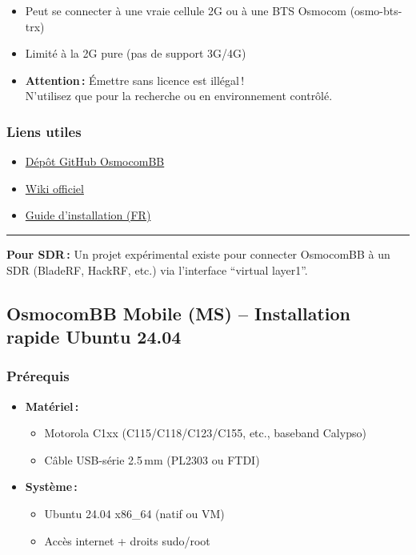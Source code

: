 \documentclass[
]{article}
\providecommand{\tightlist}{%
  \setlength{\itemsep}{0pt}\setlength{\parskip}{0pt}}
\begin{document}
\begin{itemize}
\tightlist
\item
  Peut se connecter à une vraie cellule 2G ou à une BTS Osmocom
  (osmo-bts-trx)
\item
  Limité à la 2G pure (pas de support 3G/4G)
\item
  \textbf{Attention\,:} Émettre sans licence est illégal\,!\\
  N'utilisez que pour la recherche ou en environnement contrôlé.
\end{itemize}

\subsubsection{Liens utiles}\label{liens-utiles}

\begin{itemize}
\tightlist
\item
  \href{https://github.com/osmocom/osmocom-bb}{Dépôt GitHub OsmocomBB}
\item
  \href{https://osmocom.org/projects/baseband/wiki/OsmocomBB}{Wiki
  officiel}
\item
  \href{https://www.lafabriquedunet.fr/blog/osmocombb-guide/}{Guide
  d'installation (FR)}
\end{itemize}

\begin{center}\rule{0.5\linewidth}{0.5pt}\end{center}

\textbf{Pour SDR\,:} Un projet expérimental existe pour connecter
OsmocomBB à un SDR (BladeRF, HackRF, etc.) via l'interface ``virtual
layer1''.

\subsection{OsmocomBB Mobile (MS) -- Installation rapide Ubuntu
24.04}\label{osmocombb-mobile-ms-installation-rapide-ubuntu-24.04}

\subsubsection{Prérequis}\label{pruxe9requis}

\begin{itemize}
\item
  \textbf{Matériel\,:}

  \begin{itemize}
  \tightlist
  \item
    Motorola C1xx (C115/C118/C123/C155, etc., baseband Calypso)
  \item
    Câble USB-série 2.5\,mm (PL2303 ou FTDI)
  \end{itemize}
\item
  \textbf{Système\,:}

  \begin{itemize}
  \tightlist
  \item
    Ubuntu 24.04 x86\_64 (natif ou VM)
  \item
    Accès internet + droits sudo/root
  \end{itemize}
\end{itemize}
\end{document}
